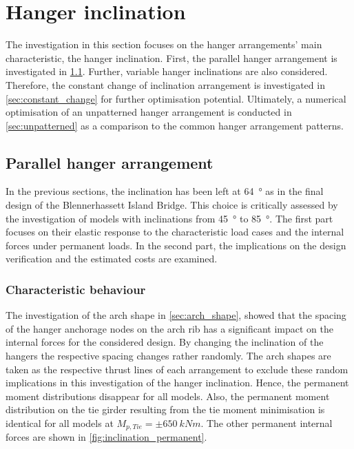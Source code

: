 \newpage
\section{Hanger inclination} \label{sec:inclination}
The investigation in this section focuses on the hanger arrangements' main characteristic, the hanger inclination. First, the parallel hanger arrangement is investigated in \cref{sec:parallel}. Further, variable hanger inclinations are also considered. Therefore, the constant change of inclination arrangement is investigated in \cref{sec:constant_change} for further optimisation potential. Ultimately, a numerical optimisation of an unpatterned hanger arrangement is conducted in \cref{sec:unpatterned} as a comparison to the common hanger arrangement patterns.


\subsection{Parallel hanger arrangement}\label{sec:parallel}
In the previous sections, the inclination has been left at \SI{64}{\degree} as in the final design of the Blennerhassett Island Bridge. This choice is critically assessed by the investigation of models with inclinations from \SI{45}{\degree} to \SI{85}{\degree}. The first part focuses on their elastic response to the characteristic load cases and the internal forces under permanent loads.  In the second part, the implications on the design verification and the estimated costs are examined. 
 
\subsubsection{Characteristic behaviour}
The investigation of the arch shape in \cref{sec:arch_shape}, showed that the spacing of the hanger anchorage nodes on the arch rib has a significant impact on the internal forces for the considered design. By changing the inclination of the hangers the respective spacing changes rather randomly. The arch shapes are taken as the respective thrust lines of each arrangement to exclude these random implications in this investigation of the hanger inclination. Hence, the permanent moment distributions disappear for all models. Also, the permanent moment distribution on the tie girder resulting from the tie moment minimisation is identical for all models at $M_{p,Tie}=\pm \SI{650}{kNm}$. The other permanent internal forces are shown in \cref{fig:inclination_permanent}.

